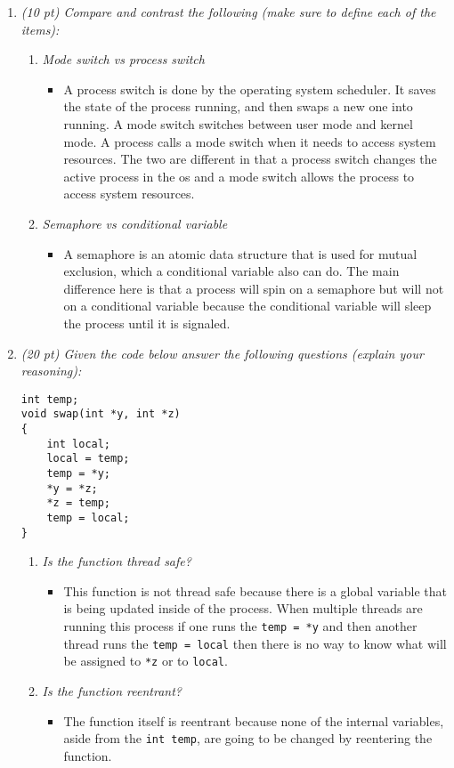 \documentclass[12pt]{article}
\begin{document}
\begin{enumerate}
\item{\textit{(10 pt) Compare and contrast the following (make sure to define each of the items):}}
\begin{enumerate}
\item{\textit{Mode switch vs process switch}}
\begin{itemize}
  \item A process switch is done by the operating system scheduler. It saves the state of the process running, and then swaps a new one into running. A mode switch switches between user mode and kernel mode. A process calls a mode switch when it needs to access system resources. The two are different in that a process switch changes the active process in the os and a mode switch allows the process to access system resources.
\end{itemize}
\item{\textit{Semaphore vs conditional variable}}
\begin{itemize}
  \item A semaphore is an atomic data structure that is used for mutual exclusion, which a conditional variable also can do. The main difference here is that a process will spin on a semaphore but will not on a conditional variable because the conditional variable will sleep the process until it is signaled.
\end{itemize}
\end{enumerate}

\item{\textit{(20 pt) Given the code below answer the following questions (explain your reasoning):}}
\begin{small}
\begin{Verbatim}[xleftmargin=5mm]
int temp;
void swap(int *y, int *z)
{
    int local;
    local = temp;
    temp = *y;
    *y = *z;
    *z = temp;
    temp = local;
}
\end{Verbatim}
\end{small}
\begin{enumerate}
\item{\textit{Is the function thread safe?}}
\begin{itemize}
  \item This function is not thread safe because there is a global variable that is being updated inside of the process. When multiple threads are running this process if one runs the \verb|temp = *y| and then another thread runs the \verb|temp = local| then there is no way to know what will be assigned to \verb|*z| or to \verb|local|.
\end{itemize}
\item{\textit{Is the function reentrant?}}
\begin{itemize}
  \item The function itself is reentrant because none of the internal variables, aside from the \verb|int temp|, are going to be changed by reentering the function.
\end{itemize}
\end{enumerate}


\end{enumerate}
\end{document}
